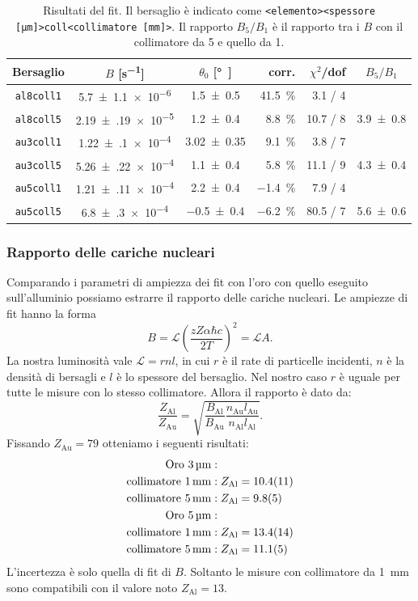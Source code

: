 \begin{table}
	\centering
	\begin{tabular}{cccrrc}
		Bersaglio & $B$ [\si{s^{-1}}] & $\theta_0$ [\si\degree] & corr. & $\chi^2$/dof & $B_5/B_1$ \\
		\hline
		\texttt{al8coll1} & \num{5.7(11)e-6 } & \num{1.5 \pm 0.5  } & \SI{41.5} \% & 3.1 / 4  & \\
		\texttt{al8coll5} & \num{2.19(19)e-5} & \num{1.2 \pm 0.4  } & \SI{8.8 }\%  & 10.7 / 8 & \num{3.9 \pm 0.8} \\
		\texttt{au3coll1} & \num{1.22(10)e-4} & \num{3.02 \pm 0.35} & \SI{9.1 }\%  & 3.8 / 7  & \\
		\texttt{au3coll5} & \num{5.26(22)e-4} & \num{1.1 \pm 0.4  } & \SI{5.8 }\%  & 11.1 / 9 & \num{4.3 \pm 0.4} \\
		\texttt{au5coll1} & \num{1.21(11)e-4} & \num{2.2 \pm 0.4  } & \SI{-1.4} \% & 7.9 / 4  & \\
		\texttt{au5coll5} & \num{6.8(3)e-4  } & \num{-0.5 \pm 0.4 } & \SI{-6.2} \% & 80.5 / 7 & \num{5.6 \pm 0.6} 
	\end{tabular}
	\caption{\label{tab:fit}
	Risultati del fit. Il bersaglio è indicato come
	\texttt{<elemento><spessore [\si{\micro m}]>coll<collimatore [\si{mm}]>}.
	Il rapporto $B_5/B_1$ è il rapporto tra i $B$ con il collimatore da 5 e quello da 1.}
\end{table}

\subsubsection{Rapporto delle cariche nucleari}

Comparando i parametri di ampiezza dei fit con l'oro con quello eseguito sull'alluminio
possiamo estrarre il rapporto delle cariche nucleari.
Le ampiezze di fit hanno la forma
$$ B=\mathcal{L} \left( \frac {zZ\alpha\hbar c} {2T} \right)^2 = \mathcal{L} A. $$
La nostra luminosità vale $\mathcal{L}=r n l$, in cui $r$ è il rate di particelle incidenti, $n$  è la densità di bersagli e $l$ è lo spessore del bersaglio.
Nel nostro caso $r$ è uguale per tutte le misure con lo stesso collimatore.
Allora il rapporto è dato da:
\begin{equation*}
\frac {Z_{\text{Al}}} {Z_{\text{Au}}}
= \sqrt{ \frac{B_{\text{Al}}}{B_{\text{Au}}} \frac{n_{\text{Au}} l_{\text{Au}}}{n_{\text{Al}} l_{\text{Al}}} }.
\end{equation*}
Fissando $Z_\text{Au}=79$ otteniamo i seguenti risultati:
\begin{align*}
\text{Oro } \SI3{\micro m}&:\\
\text{collimatore } \SI1{mm}&: Z_{\text{Al}}=\num{10.4\pm1.1} \\
\text{collimatore } \SI5{mm}&: Z_{\text{Al}}=\num{9.8\pm0.5} \\
\text{Oro } \SI5{\micro m}&:\\           
\text{collimatore } \SI1{mm}&: Z_{\text{Al}}=\num{13.4\pm1.4} \\
\text{collimatore } \SI5{mm}&: Z_{\text{Al}}=\num{11.1\pm0.5} \\
\end{align*}
L'incertezza è solo quella di fit di $B$.
Soltanto le misure con collimatore da \SI{1}{mm} sono compatibili con il valore noto $Z_\text{Al}=13$.
